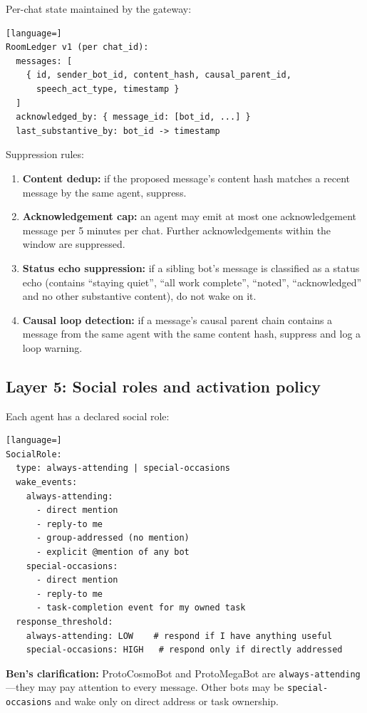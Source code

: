 \documentclass[11pt]{article}
\begin{document}
Per-chat state maintained by the gateway:

\begin{lstlisting}[language=]
RoomLedger v1 (per chat_id):
  messages: [
    { id, sender_bot_id, content_hash, causal_parent_id,
      speech_act_type, timestamp }
  ]
  acknowledged_by: { message_id: [bot_id, ...] }
  last_substantive_by: bot_id -> timestamp
\end{lstlisting}

Suppression rules:
\begin{enumerate}
\item \textbf{Content dedup:} if the proposed message's content hash matches a
recent message by the same agent, suppress.
\item \textbf{Acknowledgement cap:} an agent may emit at most one
acknowledgement message per 5 minutes per chat.  Further acknowledgements
within the window are suppressed.
\item \textbf{Status echo suppression:} if a sibling bot's message is
classified as a status echo (contains ``staying quiet'', ``all work
complete'', ``noted'', ``acknowledged'' and no other substantive content),
do not wake on it.
\item \textbf{Causal loop detection:} if a message's causal parent chain
contains a message from the same agent with the same content hash, suppress
and log a loop warning.
\end{enumerate}

\subsection{Layer 5: Social roles and activation policy}

Each agent has a declared social role:

\begin{lstlisting}[language=]
SocialRole:
  type: always-attending | special-occasions
  wake_events:
    always-attending:
      - direct mention
      - reply-to me
      - group-addressed (no mention)
      - explicit @mention of any bot
    special-occasions:
      - direct mention
      - reply-to me
      - task-completion event for my owned task
  response_threshold:
    always-attending: LOW    # respond if I have anything useful
    special-occasions: HIGH   # respond only if directly addressed
\end{lstlisting}

\textbf{Ben's clarification:} ProtoCosmoBot and ProtoMegaBot are
\texttt{always-attending}---they may pay attention to every message.  Other
bots may be \texttt{special-occasions} and wake only on direct address or
task ownership.
\end{document}
